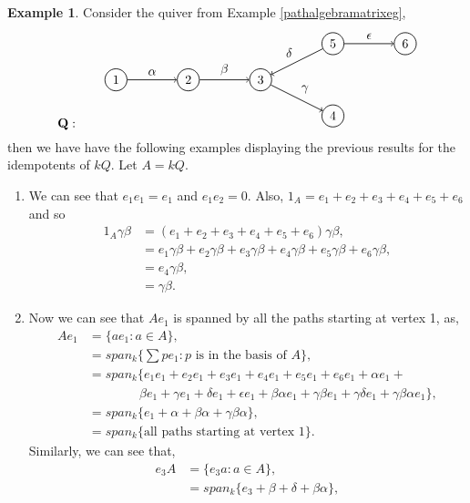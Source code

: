 \documentclass[11.5pt, twoside, a4paper, titlepage]{report}
\providecommand{\equ}[0]{\begin{equation*}}
\providecommand{\eequ}[0] {\end{equation*}}
\theoremstyle{definition}
\newtheorem{eg}[mydef]{Example}
\theoremstyle{plain}
\begin{document}
\begin{eg}
Consider the quiver from Example \ref{pathalgebramatrixeg}, 
\equ
\mathbf{Q}: \qquad
\begin{tikzpicture}[->,-latex, auto, every path/.style={->, semithick}, main node/.style={draw, circle}]
\node	[main node]		(1) at (0,0)		{1};
\node [main node]		(2) at (2,0)		{2};
\node [main node]		(3) at (4,0)		{3};
\node [main node]		(4) at (6,-1)		{4};
\node [main node]		(5) at (6,1)		{5};
\node [main node]		(6) at (8, 1)		{6};

\draw (1) edge node [auto] {$\alpha$} (2);
\draw (2) edge node [auto] {$\beta$} (3);
\draw (3) edge node [auto] {$\gamma$} (4);
\draw (5) edge node [auto, swap] {$\delta$} (3);
\draw (5) edge node [auto] {$\epsilon$} (6);
\end{tikzpicture}
\eequ
then we have have the following examples displaying the previous results for the idempotents of $kQ$. Let $A=kQ$.
\begin{enumerate}
\item We can see that $e_1e_1=e_1$ and $e_1e_2=0$. Also, $1_{A}=e_1 + e_2 + e_3 +e_4+e_5+e_6$ and so
\begin{align*}
1_A\gamma\beta&=(e_1 + e_2 + e_3 +e_4+e_5+e_6)\gamma\beta, \\
&=e_1\gamma\beta + e_2\gamma\beta + e_3\gamma\beta + e_4\gamma\beta + e_5\gamma\beta +e_6 \gamma\beta,\\
&=e_4\gamma\beta,\\
&=\gamma\beta.
\end{align*}
\item Now we can see that $Ae_1$ is spanned by all the paths starting at vertex 1, as,
\begin{align*}
Ae_1&=\{ae_1: a \in A\},\\
&=span_k\{\sum pe_1: p \text{ is in the basis of }A\},\\
&=span_k\{e_1e_1 + e_2e_1 + e_3e_1 +e_4e_1+e_5e_1+e_6e_1+\alpha e_1 + \\
&\qquad \qquad  \beta e_1 + \gamma e_1 + \delta e_1 +\epsilon e_1 +\beta\alpha e_1 + \gamma\beta e_1 + \gamma\delta e_1 + \gamma\beta\alpha e_1\}, \\
&=span_k\{e_1 + \alpha + \beta\alpha + \gamma\beta\alpha\}, \\
&=span_k\{\text{all paths starting at vertex 1}\}.
\end{align*}
Similarly, we can see that,
\begin{align*}
e_3A&=\{e_3a: a\in A\},\\
&=span_k\{e_3+\beta+\delta+\beta\alpha\},\\

\end{align*}
\end{enumerate}
\end{eg}
\end{document}
